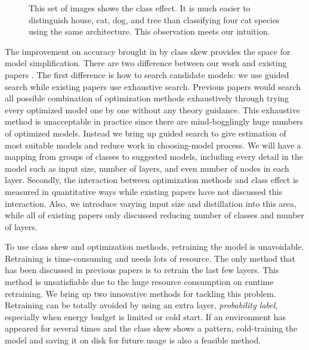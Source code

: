 \documentclass[conference]{IEEEtran}
\begin{document}
\begin{spacing}{0.9}
\begin{figure}
\begin{subfigure}{.15\textwidth}
\end{subfigure}

\caption{This set of images shows the class effect. It is much easier to distinguish house, cat, dog, and tree than classifying four cat species using the same architecture. This observation meets our intuition.}
\label{fig:classEffect}
\end{figure}




The improvement on accuracy brought in by class skew provides the space for model simplification. There are two difference between our work and existing papers \cite{han2016mcdnn, kang2017noscope}. The first difference is how to search candidate models: we use guided search while existing papers use exhaustive search. Previous papers would search all possible combination of optimization methods exhaustively through trying every optimized model one by one without any theory guidance. This exhaustive method is unacceptable in practice since there are mind-bogglingly huge numbers of optimized models. Instead we bring up guided search to give estimation of most suitable models and reduce work in choosing-model process. We will have a mapping from groups of classes to suggested models, including every detail in the model such as input size, number of layers, and even number of nodes in each layer. Secondly, the interaction between optimization methods and class effect is measured in quantitative ways while existing papers have not discussed this interaction. Also, we introduce varying input size and distillation into this area, while all of existing papers only discussed reducing number of classes and number of layers.  



To use class skew and optimization methods, retraining the model is unavoidable. Retraining is time-consuming and needs lots of resource. The only method that has been discussed in previous papers is to retrain the last few layers. This method is unsatisfiable due to the huge resource consumption on runtime retraining. We bring up two innovative methods for tackling this problem. Retraining can be totally avoided by using an extra layer, \textit{probability label}, especially when energy budget is limited or cold start. If an environment has appeared for several times and the class skew shows a pattern, cold-training the model and saving it on disk for future usage is also a feasible method. 



\end{spacing}
\end{document}
